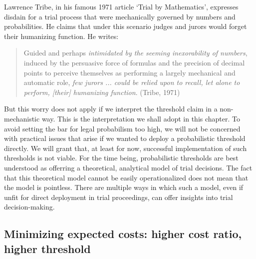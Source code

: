 \documentclass[10pt,dvipsnames,enabledeprecatedfontcommands]{scrartcl}
\begin{document}
Lawrence Tribe, in his famous 1971 article `Trial by Mathematics',
expresses disdain for a trial process that were mechanically governed by
numbers and probabilities. He claims that under this scenario judges and
jurors would forget their humanizing function. He writes:

\begin{quote}
Guided and perhaps
\textit{intimidated by the seeming inexorability of numbers}, induced by
the persuasive force of formulas and the precision of decimal points to
perceive themselves as performing a largely mechanical and automatic
role, \textit{few jurors ... 
could be relied upon to recall, let alone to 
perform, [their] humanizing function}. \hspace*{\fill} (Tribe, 1971)
\end{quote}

\noindent But this worry does not apply if we interpret the threshold
claim in a non-mechanistic way. This is the interpretation we shall
adopt in this chapter. To avoid setting the bar for legal probabilism
too high, we will not be concerned with practical issues that arise if
we wanted to deploy a probabilistic threshold directly. We will grant
that, at least for now, successful implementation of such thresholds is
not viable. For the time being, probabilistic thresholds are best
understood as offerring a theoretical, analytical model of trial
decisions. The fact that this theoretical model cannot be easily
operationalized does not mean that the model is pointless. There are
multiple ways in which such a model, even if unfit for direct deployment
in trial proceedings, can offer insights into trial decision-making.

\hypertarget{minimizing-expected-costs-higher-cost-ratio-higher-threshold}{%
\subsection{Minimizing expected costs: higher cost ratio, higher
threshold}\label{minimizing-expected-costs-higher-cost-ratio-higher-threshold}}
\end{document}
